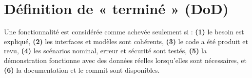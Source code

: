 \section{Définition de « terminé » (DoD)}
Une fonctionnalité est considérée comme achevée seulement si : \textbf{(1)} le besoin est expliqué, \textbf{(2)} les interfaces et modèles sont cohérents, \textbf{(3)} le code a été produit et revu, \textbf{(4)} les scénarios nominal, erreur et sécurité sont testés, \textbf{(5)} la démonstration fonctionne avec des données réelles lorsqu’elles sont nécessaires, et \textbf{(6)} la documentation et le commit sont disponibles.
